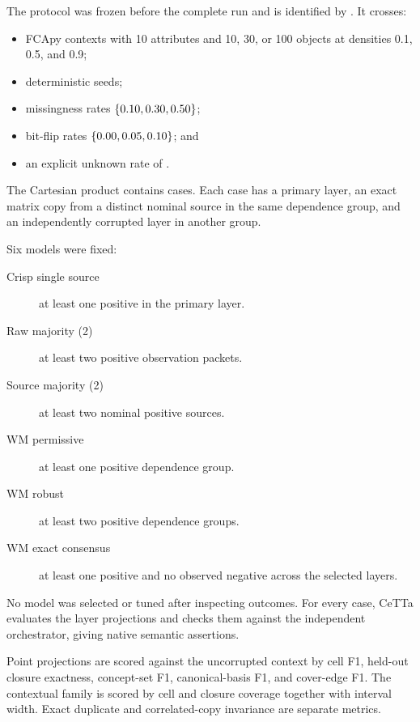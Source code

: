 \documentclass[11pt]{article}
\begin{document}
The protocol was frozen before the complete run and is identified by
\WMFCAProtocolHash. It crosses:
\begin{itemize}
  \item \WMFCACorruptionContextCount{} FCApy contexts with 10 attributes and
        10, 30, or 100 objects at densities 0.1, 0.5, and 0.9;
  \item \WMFCASeedCount{} deterministic seeds;
  \item missingness rates $\{0.10, 0.30, 0.50\}$;
  \item bit-flip rates $\{0.00, 0.05, 0.10\}$; and
  \item an explicit unknown rate of \WMFCAUnknownRate.
\end{itemize}
The Cartesian product contains \WMFCACaseCount{} cases. Each case has a
primary layer, an exact matrix copy from a distinct nominal source in the same
dependence group, and an independently corrupted layer in another group.

Six models were fixed:
\begin{description}
  \item[Crisp single source] at least one positive in the primary layer.
  \item[Raw majority (2)] at least two positive observation packets.
  \item[Source majority (2)] at least two nominal positive sources.
  \item[WM permissive] at least one positive dependence group.
  \item[WM robust] at least two positive dependence groups.
  \item[WM exact consensus] at least one positive and no observed negative
        across the selected layers.
\end{description}
No model was selected or tuned after inspecting outcomes. For every case,
CeTTa evaluates the layer projections and checks them against the independent
orchestrator, giving \WMFCAAssertionCount{} native semantic assertions.

Point projections are scored against the uncorrupted context by cell F1,
held-out closure exactness, concept-set F1, canonical-basis F1, and cover-edge
F1. The contextual family is scored by cell and closure coverage together
with interval width. Exact duplicate and correlated-copy invariance are
separate metrics.
\end{document}
